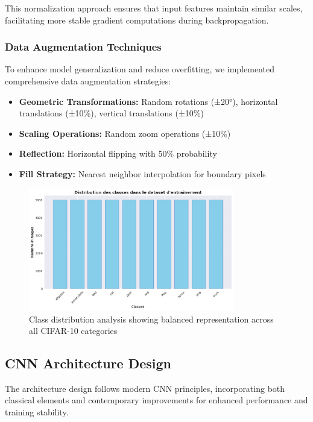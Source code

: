 \documentclass[11pt,a4paper]{article}
\begin{document}
This normalization approach ensures that input features maintain similar scales, facilitating more stable gradient computations during backpropagation.

\subsubsection{Data Augmentation Techniques}

To enhance model generalization and reduce overfitting, we implemented comprehensive data augmentation strategies:

\begin{itemize}
    \item \textbf{Geometric Transformations:} Random rotations (±20°), horizontal translations (±10\%), vertical translations (±10\%)
    \item \textbf{Scaling Operations:} Random zoom operations (±10\%)
    \item \textbf{Reflection:} Horizontal flipping with 50\% probability
    \item \textbf{Fill Strategy:} Nearest neighbor interpolation for boundary pixels
\end{itemize}

\begin{figure}[H]
    \centering
    \includegraphics[width=0.8\textwidth]{tp2_cnn_img/cell_06_output_01_image_02.png}
    \caption{Class distribution analysis showing balanced representation across all CIFAR-10 categories}
    \label{fig:class_distribution}
\end{figure}

\subsection{CNN Architecture Design}

The architecture design follows modern CNN principles, incorporating both classical elements and contemporary improvements for enhanced performance and training stability.
\end{document}
